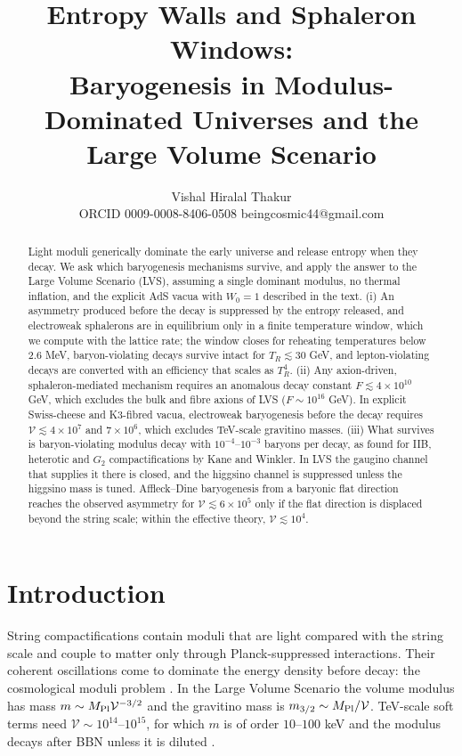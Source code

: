 \documentclass[11pt]{article}
\newcommand{\Mpl}{M_{\rm Pl}}
\newcommand{\vol}{\mathcal{V}}
\begin{document}
\title{Entropy Walls and Sphaleron Windows:\\ Baryogenesis in Modulus-Dominated Universes and the Large Volume Scenario}
\author{Vishal Hiralal Thakur\\ \small ORCID 0009-0008-8406-0508 \quad beingcosmic44@gmail.com}
\date{}
\maketitle

\begin{abstract}
Light moduli generically dominate the early universe and release entropy when they decay. We ask which baryogenesis mechanisms survive, and apply the answer to the Large Volume Scenario (LVS), assuming a single dominant modulus, no thermal inflation, and the explicit AdS vacua with $W_0=1$ described in the text. (i) An asymmetry produced before the decay is suppressed by the entropy released, and electroweak sphalerons are in equilibrium only in a finite temperature window, which we compute with the lattice rate; the window closes for reheating temperatures below 2.6 MeV, baryon-violating decays survive intact for $T_R\lesssim30$ GeV, and lepton-violating decays are converted with an efficiency that scales as $T_R^4$. (ii) Any axion-driven, sphaleron-mediated mechanism requires an anomalous decay constant $F\lesssim4\times10^{10}$ GeV, which excludes the bulk and fibre axions of LVS ($F\sim10^{16}$ GeV). In explicit Swiss-cheese and K3-fibred vacua, electroweak baryogenesis before the decay requires $\mathcal V\lesssim4\times10^7$ and $7\times10^6$, which excludes TeV-scale gravitino masses. (iii) What survives is baryon-violating modulus decay with $10^{-4}$--$10^{-3}$ baryons per decay, as found for IIB, heterotic and $G_2$ compactifications by Kane and Winkler. In LVS the gaugino channel that supplies it there is closed, and the higgsino channel is suppressed unless the higgsino mass is tuned. Affleck--Dine baryogenesis from a baryonic flat direction reaches the observed asymmetry for $\mathcal V\lesssim6\times10^5$ only if the flat direction is displaced beyond the string scale; within the effective theory, $\mathcal V\lesssim10^4$.
\end{abstract}

\section{Introduction}

String compactifications contain moduli that are light compared with the string scale and couple to matter only through Planck-suppressed interactions. Their coherent oscillations come to dominate the energy density before decay: the cosmological moduli problem \cite{Coughlan,BKN,dCCQR}. In the Large Volume Scenario \cite{BBCQ,CQS} the volume modulus has mass $m\sim\Mpl\vol^{-3/2}$ and the gravitino mass is $m_{3/2}\sim\Mpl/\vol$. TeV-scale soft terms need $\vol\sim10^{14}$--$10^{15}$, for which $m$ is of order $10$--$100$ keV and the modulus decays after BBN unless it is diluted \cite{CPS}.
\end{document}
